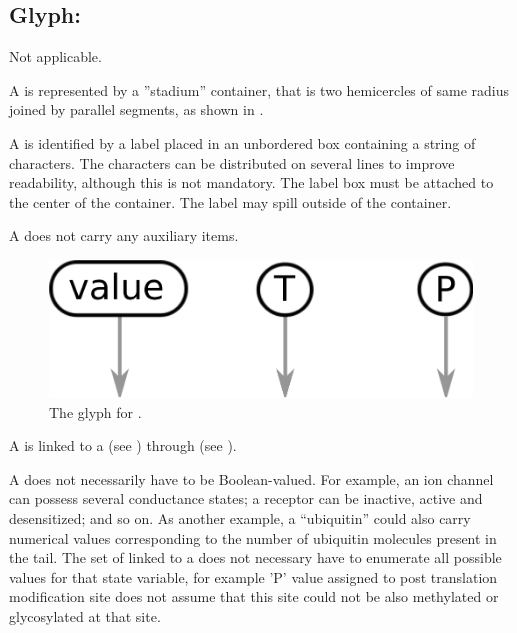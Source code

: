 
\subsection{Glyph: }
\label{sec:variableValue}

\begin{glyphDescription}
 
\glyphSboTerm Not applicable.
 
\glyphContainer A  is represented by a ''stadium'' container, that is two hemicercles of same radius joined by parallel segments, as shown in . 
 
\glyphLabel A  is identified by a label placed in an unbordered box containing a string of characters.  The characters can be distributed on several lines to improve readability, although this is not mandatory.  The label box must be attached to the center of the container.  The label may spill outside of the container.

\glyphAux A  does not carry any auxiliary items.  
 
\end{glyphDescription}
 
\begin{figure}[H]
   \centering
   \includegraphics[scale = 0.3]{images/variableValue}
   \caption{The \ER glyph for .}
   \label{fig:var-value}
\end{figure}

A  is linked to a  (see ) through  (see ). 

A  does not necessarily have to be Boolean-valued.  For example, an ion channel can possess several conductance states; a receptor can be inactive, active and desensitized; and so on.  As another example, a  ``ubiquitin'' could also carry numerical values corresponding to the number of ubiquitin molecules present in the tail. The set of   linked to a  does not necessary have to enumerate all possible values for that state variable, for example 'P' value assigned to post translation modification site does not assume that this site could not be also methylated or glycosylated at that site.

